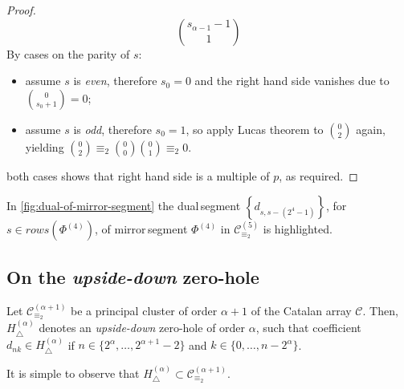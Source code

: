 \begin{proof}
\begin{displaymath}
        {{s_{\alpha-1}-1}\choose{1}}
    \end{displaymath}
    By cases on the parity of $s$:
    \begin{itemize}
        \item assume $s$ is \emph{even}, therefore $s_{0}=0$ and the right hand side vanishes due to ${{0}\choose{s_{0}+1}}=0$;
        \item assume $s$ is \emph{odd}, therefore $s_{0}=1$, so apply Lucas theorem to ${{0}\choose{2}}$ again,
            yielding ${{0}\choose{2}}\equiv_{2}{{0}\choose{0}}{{0}\choose{1}}\equiv_{2}0$.
    \end{itemize}
    both cases shows that right hand side is a multiple of $p$, as required.
\end{proof}


In \autoref{fig:dual-of-mirror-segment} the \flqq dual\frqq\,segment 
    $\left\lbrace d_{s,s-(2^{4}-1)}\right\rbrace$,
    for $s\in rows\left(\Phi^{(4)}\right)$, of \flqq mirror\frqq\,segment 
    $\Phi^{(4)}$ in $\mathcal{C}_{\equiv_{2}}^{(5)}$ is highlighted.

\subsection{On the \emph{upside-down} zero-hole}

\begin{theorem}
    Let $\mathcal{C}_{\equiv_{2}}^{(\alpha+1)}$ be a principal cluster 
    of order $\alpha+1$ of the Catalan array $\mathcal{C}$. Then, 
    $H_{\bigtriangleup}^{({\alpha})}$ denotes an \emph{upside-down} zero-hole of order $\alpha$,
    such that coefficient $d_{nk}\in H_{\bigtriangleup}^{({\alpha})}$ if 
    $n\in\lbrace 2^{{\alpha}},\ldots,2^{{\alpha}+1}-2\rbrace$ and 
    $k\in\lbrace 0,\ldots, n-2^{{\alpha}}\rbrace$. 
    \label{thm:upside:down:zero:hole}
\end{theorem}

It is simple to observe that $H_{\bigtriangleup}^{({\alpha})}\subset
\mathcal{C}_{\equiv_{2}}^{(\alpha+1)}$. 

